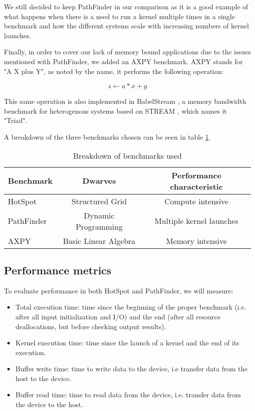 We still decided to keep PathFinder in our comparison as it is a good example of what happens when there is a need to run a kernel multiple times in a single benchmark and how the different systems scale with increasing numbers of kernel launches.

Finally, in order to cover our lack of memory bound applications due to the issues mentioned with PathFinder, we added an AXPY benchmark. AXPY stands for "A X plus Y", as noted by the name, it performs the following operation:

\[
    z \leftarrow a*x+y
\]

This same operation is also implemented in BabelStream \cite{babelstream}, a memory bandwidth benchmark for heterogenous systems based on STREAM \cite{stream}, which names it "Triad". 

A breakdown of the three benchmarks chosen can be seen in table \ref{tab:benchmark-breakdown}.

\begin{table}[ht]
    \centering
    \begin{tabular}{l|c|c}
    Benchmark & Dwarves & Performance characteristic \\ \hline
    HotSpot & Structured Grid & Compute intensive \\
    PathFinder & Dynamic Programming & Multiple kernel launches \\
    AXPY & Basic Linear Algebra & Memory intensive          
    \end{tabular}
    \captionsetup{justification=centering}
    \caption{Breakdown of benchmarks used}
    \label{tab:benchmark-breakdown}
\end{table}

\subsection{Performance metrics}

To evaluate performance in both HotSpot and PathFinder, we will measure:

\begin{itemize}
    \item Total execution time: time since the beginning of the proper benchmark (i.e. after all input initialization and I/O) and the end (after all resource deallocations, but before checking output results).
    \item Kernel execution time: time since the launch of a kernel and the end of its execution.
    \item Buffer write time: time to write data to the device, i.e transfer data from the host to the device.
    \item Buffer read time: time to read data from the device, i.e. transfer data from the device to the host.
\end{itemize}

